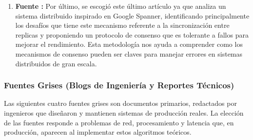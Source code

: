 \documentclass[12pt,letterpaper]{article}
\begin{document}
\begin{enumerate}
    
    \item \textbf{Fuente \cite{maiyya2021}:} Por último, se escogió este último artículo ya que analiza un sistema distribuido inspirado en Google Spanner, identificando principalmente los desafíos que tiene este mecanismo referente a la sincronización entre replicas y proponiendo un protocolo de consenso que es tolerante a fallos para mejorar el rendimiento. Esta metodología nos ayuda a comprender como los mecanismos de consenso pueden ser claves para manejar errores en sistemas distribuidos de gran escala.
    
\end{enumerate}

\subsubsection{Fuentes Grises (Blogs de Ingeniería y Reportes Técnicos)}

Las siguientes cuatro fuentes grises son documentos primarios, redactados por ingenieros que diseñaron y mantienen sistemas de producción reales. La elección de las fuentes responde a problemas de red, procesamiento y latencia que, en producción, aparecen al implementar estos algoritmos teóricos.
\end{document}
